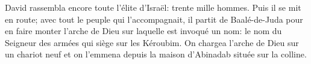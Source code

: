David rassembla encore toute l’élite d’Israël: trente mille hommes.
Puis il se mit en route; avec tout le peuple qui l’accompagnait,
	il partit de Baalé-de-Juda pour en faire monter l’arche de Dieu
		sur laquelle est invoqué un nom:
	le nom du Seigneur des armées qui siège sur les Kéroubim.
On chargea l’arche de Dieu sur un chariot neuf
	et on l’emmena depuis la maison d’Abinadab située sur la colline. 
